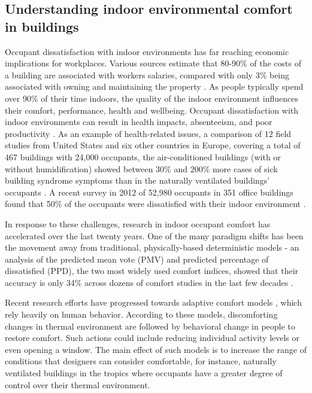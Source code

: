\documentclass[]{interact}
\theoremstyle{plain}%
\theoremstyle{definition}
\theoremstyle{remark}
\begin{document}
\subsection{Understanding indoor environmental comfort in buildings}
Occupant dissatisfaction with indoor environments has far reaching economic implications for workplaces. Various sources estimate that 80-90\% of the costs of a building are associated with workers salaries, compared with only 3\% being associated with owning and maintaining the property \citep{Creativeandproductiveworkplaces, kats2003green, wilson2005making}. As people typically spend over 90\% of their time indoors, the quality of the indoor environment influences their comfort, performance, health and wellbeing. Occupant dissatisfaction with indoor environments can result in health impacts, absenteeism, and poor productivity \citep{MiltonDonaldK.P.MarkGlencross2000}. As an example of health-related issues, a comparison of 12 field studies from United States and six other countries in Europe, covering a total of 467 buildings with 24,000 occupants, the air-conditioned buildings (with or without humidification) showed between 30\% and 200\% more cases of sick building syndrome symptoms than in the naturally ventilated buildings' occupants \citep{Evolvingopportunities, ventilationsystemtype}. A recent survey in 2012 of 52,980 occupants in 351 office buildings found that 50\% of the occupants were dissatisfied with their indoor environment \citep{Frontczak2012QuantitativeDesign}. 


In response to these challenges, research in indoor occupant comfort has accelerated over the last twenty years. One of the many paradigm shifts has been the movement away from traditional, physically-based deterministic models - an analysis of the predicted mean vote (PMV) and predicted percentage of dissatisfied (PPD), the two most widely used comfort indices, showed that their accuracy is only 34\% across dozens of comfort studies in the last few decades \cite{CHEUNG2019205,FOLDVARYLICINA2018502}.
 
Recent research efforts have progressed towards adaptive comfort models \citep{Ferrari2012AdaptiveIndices, Nicol2013AdaptiveWorld, vanHoof2010ThermalPractice}, which rely heavily on human behavior. According to these models, discomforting changes in thermal environment are followed by behavioral change in people to restore comfort. Such actions could include reducing individual activity levels or even opening a window. The main effect of such models is to increase the range of conditions that designers can consider comfortable, for instance, naturally ventilated buildings in the tropics where occupants have a greater degree of control over their thermal environment.
\end{document}
